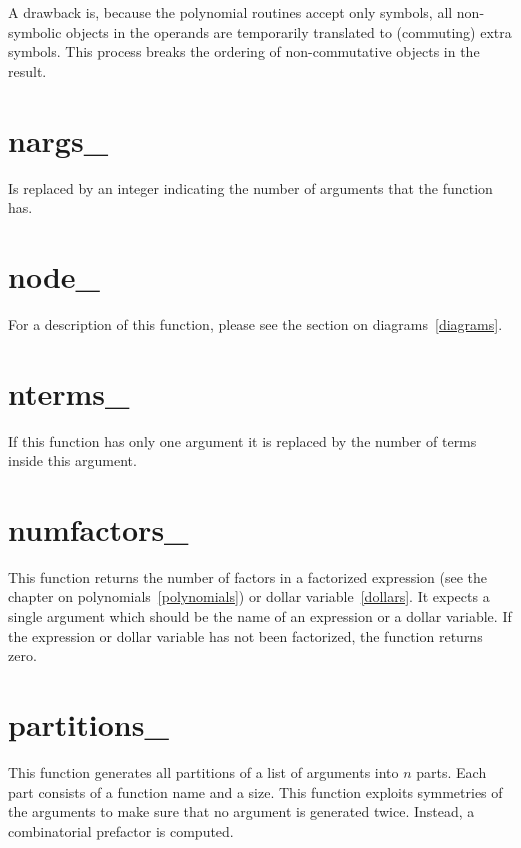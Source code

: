 A drawback is, because the polynomial routines accept only symbols, all
non-symbolic objects in the operands are temporarily translated to (commuting)
extra symbols. This process breaks the ordering of non-commutative objects
in the result.


\section{nargs\_}
\label{funnargs}
\noindent Is replaced by an integer indicating the number of 
arguments that the function has.


\section{node\_}
\label{funtonode}
\noindent For a description of this function, please see the section on 
diagrams~\ref{diagrams}.


\section{nterms\_}
\label{funnterms}
\noindent If this function has only one argument it is replaced by 
the number of terms inside this argument.


\section{numfactors\_}
\label{funnumfactors}

\noindent This function returns the number of factors in a factorized 
expression (see the chapter on polynomials~\ref{polynomials}) or dollar 
variable~\ref{dollars}. It expects a single argument which should be the 
name of an expression or a dollar variable. If the expression or dollar 
variable has not been factorized, the function returns zero.


\section{partitions\_}
\label{funpartitions}
\noindent This function generates all partitions of a list of arguments into
$n$ parts. Each part consists of a function name and a size.
This function exploits symmetries of the arguments to make sure that no argument
is generated twice. Instead, a combinatorial prefactor is computed.

